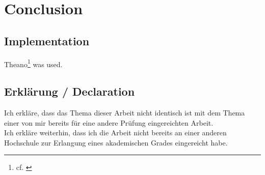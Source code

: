 \documentclass[11pt, a4paper]{article}
\begin{document}
\section{Conclusion}

\newpage


\begin{appendix}
	\section{Implementation}
	
	Theano\footnote{cf. \cite{theano}} was used.
	
\end{appendix}

\newpage

\listoffigures

\newpage

{}


\newpage

\thispagestyle{empty}

\begin{center}
\subsection*{Erklärung / Declaration}
\end{center}
\vspace{0.5cm}
Ich erkläre, dass das Thema dieser Arbeit nicht identisch ist mit dem Thema einer von mir bereits für eine andere Prüfung eingereichten Arbeit.\\
Ich erkläre weiterhin, dass ich die Arbeit nicht bereits an einer anderen Hochschule zur Erlangung eines akademischen Grades eingereicht habe.
\end{document}
